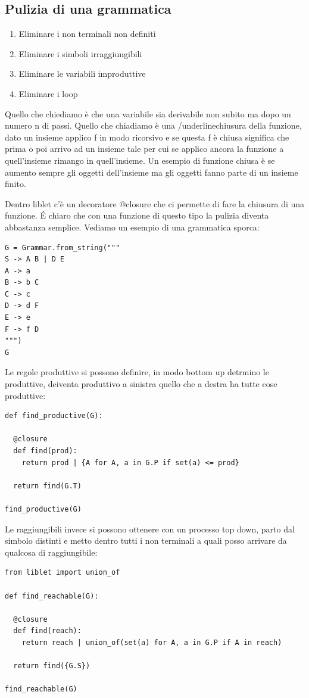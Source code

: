 \subsection{Pulizia di una grammatica}
\begin{enumerate}
    \item Eliminare i non terminali non definiti
    \item Eliminare i simboli irraggiungibili
    \item Eliminare le variabili improduttive
    \item Eliminare i loop
\end{enumerate}

Quello che chiediamo è che una variabile sia derivabile non subito ma dopo un numero n di passi. Quello che chiadiamo è una /underline{chiusura della funzione}, dato un insieme applico f in modo ricorsivo e se questa f è chiusa significa che prima o poi arrivo ad un insieme tale per cui se applico ancora la funzione a quell'insieme rimango in quell'insieme. Un esempio di funzione chiusa è se aumento sempre gli oggetti dell'insieme ma gli oggetti fanno parte di un insieme finito.

Dentro liblet c'è un decoratore @closure che ci permette di fare la chiusura di una funzione. \'E chiaro che con una funzione di questo tipo la pulizia diventa abbastanza semplice. Vediamo un esempio di una grammatica sporca:
\begin{lstlisting}
G = Grammar.from_string("""
S -> A B | D E
A -> a
B -> b C
C -> c
D -> d F 
E -> e 
F -> f D
""")
G
\end{lstlisting}

Le regole produttive si possono definire, in modo bottom up detrmino le produttive, deiventa produttivo a sinistra quello che a destra ha tutte cose produttive:
\begin{lstlisting}
def find_productive(G):

  @closure
  def find(prod):
    return prod | {A for A, a in G.P if set(a) <= prod}

  return find(G.T)

find_productive(G)
\end{lstlisting}

Le raggiungibili invece si possono ottenere con un processo top down, parto dal simbolo distinti e metto dentro tutti i non terminali a quali posso arrivare da qualcosa di raggiungibile:

\begin{lstlisting}
from liblet import union_of

def find_reachable(G):

  @closure
  def find(reach):
    return reach | union_of(set(a) for A, a in G.P if A in reach)

  return find({G.S})

find_reachable(G)
\end{lstlisting}

